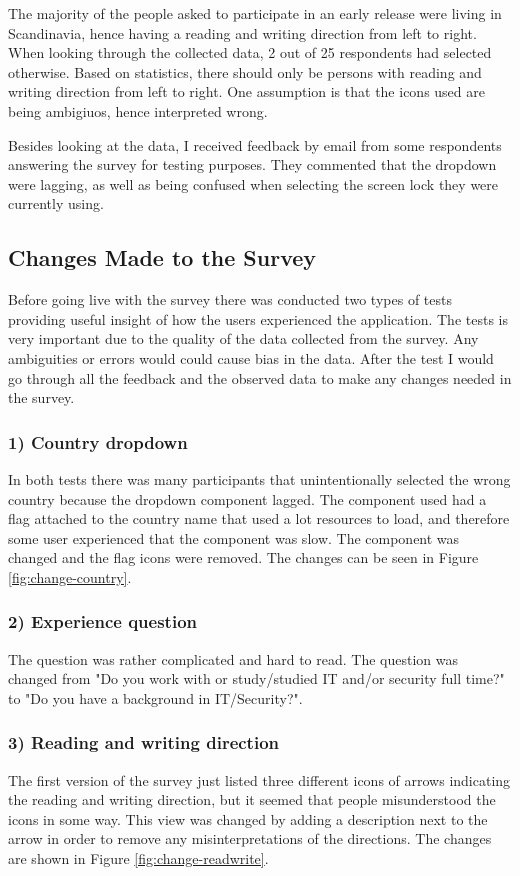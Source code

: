   The majority of the people asked to participate in an early release were living in Scandinavia, hence having a reading and writing direction from left to right. When looking through the collected data, 2 out of  25 respondents had selected otherwise. Based on statistics, there should only be persons with reading and writing direction from left to right. One assumption is that the icons used are being ambigiuos, hence interpreted wrong. 

  Besides looking at the data, I received feedback by email from some respondents answering the survey for testing purposes. They commented that the dropdown were lagging, as well as being confused when selecting the screen lock they were currently using. 

  \subsection{Changes Made to the Survey}
  Before going live with the survey there was conducted two types of tests providing useful insight of how the users experienced the application. The tests is very important due to the quality of the data collected from the survey. Any ambiguities or errors would could cause bias in the data. After the test I would go through all the feedback and the observed data to make any changes needed in the survey.

    \subsubsection*{1) Country dropdown}
    In both tests there was many participants that unintentionally selected the wrong country because the dropdown component lagged. The component used had a flag attached to the country name that used a lot resources to load, and therefore some user experienced that the component was slow. The component was changed and the flag icons were removed. The changes can be seen in Figure \ref{fig:change-country}.

    \subsubsection*{2) Experience question}
    The question was rather complicated and hard to read. The question was changed from "Do you work with or study/studied IT and/or security full time?" to "Do you have a background in IT/Security?".
      
    \subsubsection*{3) Reading and writing direction}
    The first version of the survey just listed three different icons of arrows indicating the reading and writing direction, but it seemed that people misunderstood the icons in some way. This view was changed by adding a description next to the arrow in order to remove any misinterpretations of the directions. The changes are shown in Figure \ref{fig:change-readwrite}.

